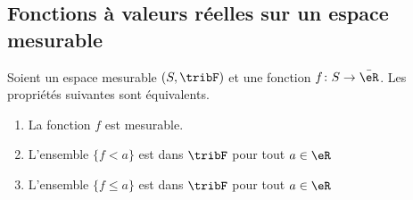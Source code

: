 \subsection{Fonctions à valeurs réelles sur un espace mesurable}

\begin{theorem}     \label{THOooWHFLooKYGsOm}
	Soient un espace mesurable \( (S,\tribF)\) et une fonction \( f\colon S\to \bar \eR\). Les propriétés suivantes sont équivalents.
	\begin{enumerate}
		\item\label{ITEMooHAMHooYLqUhVi}
		      La fonction \( f\) est mesurable.
		\item\label{ITEMooHAMHooYLqUhVii}
		      L'ensemble \( \{ f<a \}\) est dans \( \tribF\) pour tout \( a\in \eR\)
		\item\label{ITEMooHAMHooYLqUhViii}
		      L'ensemble \( \{ f\leq a \}\) est dans \( \tribF\) pour tout \( a\in \eR\)
	\end{enumerate}
\end{theorem}

